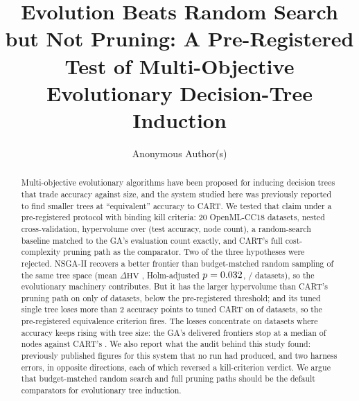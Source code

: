 \documentclass[sigconf,review,anonymous]{acmart}
\newcommand{\GA}{GA\xspace}
\newcommand{\hv}{\ensuremath{\mathrm{HV}}\xspace}
\begin{document}
\title{Evolution Beats Random Search but Not Pruning: A Pre-Registered Test of
Multi-Objective Evolutionary Decision-Tree Induction}

\author{Anonymous Author(s)}

\begin{abstract}
Multi-objective evolutionary algorithms have been proposed for inducing decision trees
that trade accuracy against size, and the system studied here was previously reported to
find smaller trees at ``equivalent'' accuracy to CART. We tested that claim under a
pre-registered protocol with binding kill criteria: 20 OpenML-CC18 datasets, nested
cross-validation, hypervolume over (test accuracy, node count), a random-search baseline
matched to the \GA's evaluation count exactly, and CART's full cost-complexity pruning
path as the comparator. Two of the three hypotheses were rejected. NSGA-II
recovers a better frontier than budget-matched random sampling of the same tree space
(mean $\Delta\hv$ \KoneDiff, Holm-adjusted $p=0.032$, \KoneWins/\NDatasets{}
datasets), so the evolutionary machinery contributes. But it has the larger hypervolume
than CART's pruning path on only \KtwoRate{} of datasets, below the pre-registered
\KtwoThreshold{} threshold; and its tuned single tree loses more than 2 accuracy points
to tuned CART on \KthreePrimary{} of \NDatasets{} datasets, so the pre-registered
equivalence criterion fires. The losses concentrate on datasets where accuracy keeps
rising with tree size: the \GA's
delivered frontiers stop at a median of \MedianMaxNodesGA{} nodes against CART's
\MedianMaxNodesCart. We also report what the audit behind this study found: previously
published figures for this system that no run had produced, and two harness errors, in
opposite directions, each of which reversed a kill-criterion verdict. We argue that
budget-matched random search and full pruning paths should be the default comparators
for evolutionary tree induction.
\end{abstract}


\maketitle

\end{document}

